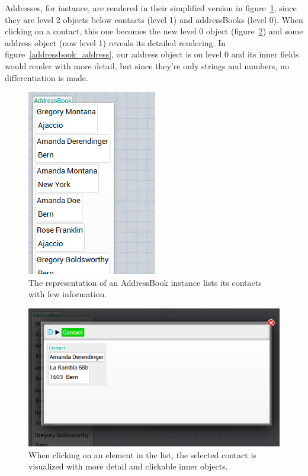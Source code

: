\documentclass[english]{acm_proc_article-sp}
\begin{document}
Addresses, for instance, are rendered in their simplified version in figure~\ref{addressbook_whole}, since they are level 2 objects below contacts (level 1) and addressBooks (level 0). When clicking on a contact, this one becomes the new level 0 object (figure~\ref{addressbook_contact}) and some address object (now level 1) reveals its detailed rendering. In figure~\ref{addressbook_address}, our address object is on level 0 and its inner fields would render with more detail, but since they're only strings and numbers, no differentiation is made.

\begin{figure}[h]
	\includegraphics{img/AddressBook_whole.png}
	\caption[AddressBook visualization]{The representation of an AddressBook instance lists its contacts with few information.}
	\label{addressbook_whole}
\end{figure}

\begin{figure}[h]
	\includegraphics[width=\linewidth]{img/AddressBook_contact.png}
	\caption[Contact visualization]{When clicking on an element in the list, the selected contact is visualized with more detail and clickable inner objects.}
	\label{addressbook_contact}
\end{figure}
\end{document}
